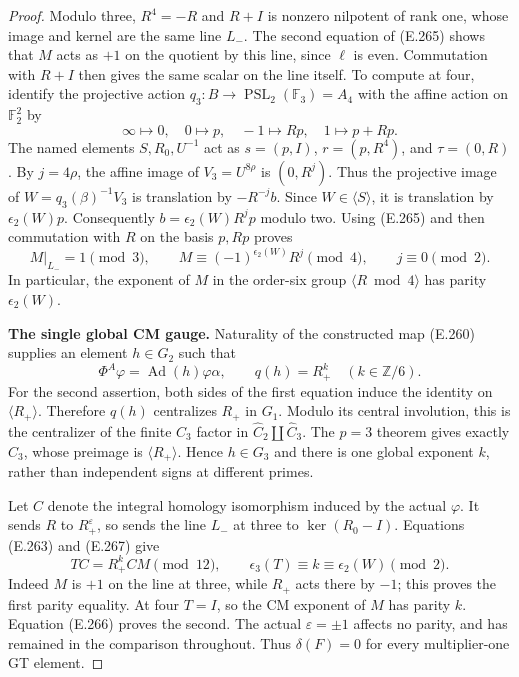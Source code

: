 \begin{proof}
Modulo three, $R^4=-R$ and $R+I$ is nonzero nilpotent
of rank one, whose image and kernel are the same
line $L_-$.  The second equation of (E.265) shows
that $M$ acts as $+1$ on the quotient by this line,
since $\ell$ is even.  Commutation with $R+I$ then
gives the same scalar on the line itself.
To compute at four, identify the projective action
$q_3:B\to\operatorname{PSL}_2(\mathbb F_3)=A_4$
with the affine action on $\mathbb F_2^2$ by
\[
 \infty\mapsto0,\quad 0\mapsto p,\quad
 -1\mapsto Rp,\quad 1\mapsto p+Rp.
\]
The named elements $S,R_0,U^{-1}$ act as
$s=(p,I)$, $r=(p,R^4)$, and $\tau=(0,R)$.
By $j=4\rho$, the affine image of $V_3=U^{8\rho}$
is $(0,R^j)$.  Thus the projective image of
$W=q_3(\beta)^{-1}V_3$ is translation by
$-R^{-j}b$.  Since $W\in\langle S\rangle$, it is
translation by $\epsilon_2(W)p$.
Consequently $b=\epsilon_2(W)R^jp$ modulo two.
Using (E.265) and then commutation with $R$ on the
basis $p,Rp$ proves
\[
 M|_{L_-}=1\pmod3,
 \qquad M\equiv(-1)^{\epsilon_2(W)}R^j\pmod4,
 \qquad j\equiv0\pmod2.
                                                               \tag{E.266}
\]
In particular, the exponent of $M$ in the order-six
group $\langle R\bmod4\rangle$ has parity
$\epsilon_2(W)$.

\par\medskip\noindent\textbf{The single global CM gauge.}\quad
Naturality of the constructed map (E.260) supplies
an element $h\in G_2$ such that
\[
 \Phi^A\varphi=\operatorname{Ad}(h)\varphi\alpha,
 \qquad q(h)=R_+^k\quad(k\in\mathbb Z/6).
                                                               \tag{E.267}
\]
For the second assertion, both sides of the first
equation induce the identity on $\langle R_+\rangle$.
Therefore $q(h)$ centralizes $R_+$ in $G_1$.
Modulo its central involution, this is the centralizer
of the finite $C_3$ factor in $\widehat C_2\amalg
\widehat C_3$.  The $p=3$ theorem gives exactly
$C_3$, whose preimage is $\langle R_+\rangle$.
Hence $h\in G_3$ and there is one global exponent
$k$, rather than independent signs at different primes.

Let $C$ denote the integral homology isomorphism
induced by the actual $\varphi$.
It sends $R$ to $R_+^{\varepsilon}$, so sends the
line $L_-$ at three to $\ker(R_0-I)$.
Equations (E.263) and (E.267) give
\[
 TC=R_+^kCM\pmod{12},\qquad
 \epsilon_3(T)\equiv k\equiv\epsilon_2(W)\pmod2.
                                                               \tag{E.268}
\]
Indeed $M$ is $+1$ on the line at three, while
$R_+$ acts there by $-1$; this proves the first
parity equality.  At four $T=I$, so the CM exponent
of $M$ has parity $k$.  Equation (E.266) proves the
second.  The actual $\varepsilon=\pm1$ affects no
parity, and has remained in the comparison throughout.
Thus $\delta(F)=0$ for every multiplier-one GT element.


\end{proof}
